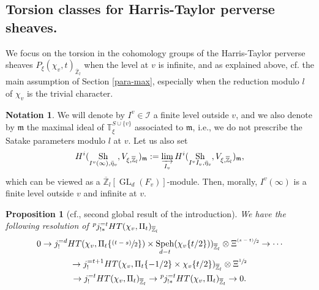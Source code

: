 \documentclass[11pt]{article}
\newcommand{\ie}{i.e.,\xspace}
\newcommand{\cf}{cf.\xspace}
\newcommand{\psfrac}[2]{\sfrac{(#1)}{#2}}
\DeclareMathOperator{\GL}{GL}
\theoremstyle{plain}
\newtheorem{prop}[equation]{Proposition}
\theoremstyle{definition}
\newtheorem{nota}[equation]{Notation}
\numberwithin{equation}{subsection}
\newcommand\Tm{{\mathbb T}}
\newcommand\Zm{{\mathbb Z}}
\newcommand\IC{{\mathcal I}}
\newcommand{\lexp}[2]{\kern \scriptspace \vphantom{#2}^{#1}\kern-\scriptspace#2}
\DeclareMathOperator{\sh}{Sh}
\DeclareMathOperator{\speh}{Speh}
\let \oo=\infty
\begin{document}
\subsection{Torsion classes for Harris-Taylor perverse sheaves.}
\label{para-torsion1}

We focus on the torsion in the cohomology groups of the Harris-Taylor perverse
sheaves $P_\xi(\chi_v,t)_{\overline \Zm_l}$ when the level at $v$ is infinite, and as explained above, \cf the main assumption of Section \ref{para-max},
especially when the reduction modulo $l$ of $\chi_v$ is the trivial character.

\begin{nota} \label{nota-mvw}
We will denote by $I^{v} \in \IC$ a finite
level outside $v$, and we also denote by
$\mathfrak m$ the maximal ideal of $\Tm^{S \cup \{v\} }_{\xi}$
associated to $\mathfrak m$, \ie we do not prescribe the Satake
parameters modulo $l$ at $v$.
Let us also set\vspace*{-3pt}
\[
H^i(\sh_{I^v(\oo),\bar \eta_v},V_{\xi,\overline \Zm_l})_{\mathfrak m}:=
\varinjlim_{{I_v}}
H^i(\sh_{I^vI_v,\bar \eta_v},V_{\xi,\overline \Zm_l})_{\mathfrak m},
\]
which can be viewed as a $\overline \Zm_l[\GL_d(F_v)]$-module.
Then, morally, $I^v(\oo)$ is a finite level outside $v$ and infinite at $v$.
\end{nota}

\begin{prop}[\cf \cite{boyer-duke}, second global result of the introduction]
We have
the following resolution of $\lexp p j_{!*}^{=t} HT(\chi_{v},\Pi_t)_{\overline \Zm_l}$\vspace*{-3pt}
\begin{multline} \label{eq-resolution0}
0 \to j_!^{=d} HT(\chi_{v},\Pi_t \{\psfrac{t-s}{2}\}) \times
\speh_{d-t}(\chi_{v}\{t/2\}))_{\overline \Zm_l}
\otimes \Xi^{\psfrac{s-t}{2}} \to \cdots \\
\to j_!^{=t+1} HT(\chi_{v},\Pi_t \{-1/2\} \times \chi_{v} \{t/2\})_{\overline \Zm_l}
\otimes \Xi^{\sfrac{1}{2}} \\
\to j_!^{=t} HT(\chi_{v},\Pi_t)_{\overline \Zm_l}
\to \lexp p j_{!*}^{=t} HT(\chi_{v},\Pi_t)_{\overline \Zm_l} \to 0.
\end{multline}
\end{prop}
\end{document}
